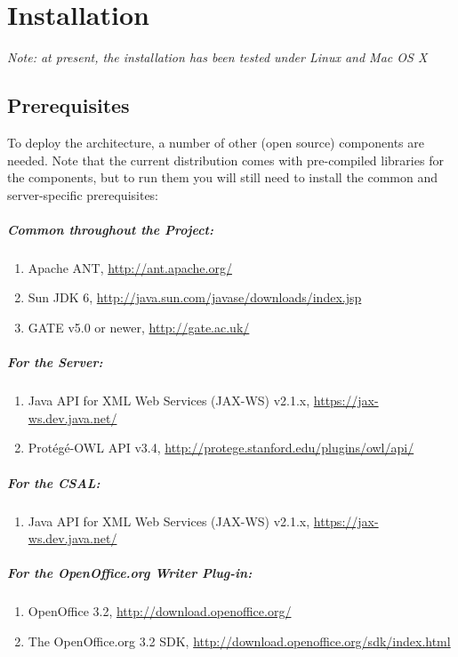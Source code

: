 \chapter{Installation}
\label{chap:inst}
\emph{Note: at present, the installation has been tested under
  Linux and Mac OS X }

\section{Prerequisites}
To deploy the \sa architecture, a number of other (open source)
components are needed.  Note that the current distribution comes with
pre-compiled libraries for the \sa components, but to run them you
will still need to install the common and server-specific
prerequisites:

\paragraph{Common throughout the Project:}
\begin{enumerate}
  \item  Apache ANT, \url{http://ant.apache.org/}
  \item  Sun JDK 6, \url{http://java.sun.com/javase/downloads/index.jsp}
  \item  GATE v5.0 or newer, \url{http://gate.ac.uk/}
\end{enumerate} 

\paragraph{For the \sa Server:}
\begin{enumerate}
  \item Java API for XML Web Services (JAX-WS) v2.1.x, \url{https://jax-ws.dev.java.net/}
  \item Prot\'{e}g\'{e}-OWL API v3.4, \url{http://protege.stanford.edu/plugins/owl/api/} 
\end{enumerate}

\paragraph{For the CSAL:}
\begin{enumerate}
  \item Java API for XML Web Services (JAX-WS) v2.1.x, \url{https://jax-ws.dev.java.net/}
\end{enumerate}

\paragraph{For the OpenOffice.org Writer Plug-in:}
\begin{enumerate}
\item OpenOffice 3.2, \url{http://download.openoffice.org/}
\item The OpenOffice.org 3.2 SDK,
  \url{http://download.openoffice.org/sdk/index.html}
\end{enumerate}

